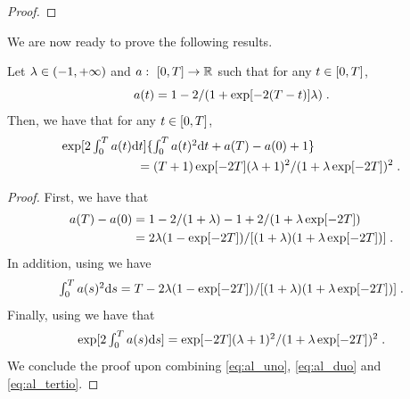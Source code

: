 \begin{proof}
  \end{proof}

    We are now ready to prove the following results.

    \begin{proposition}
      \label{prop:expression_fat_1}
      Let $\lambda \in \left(-1, +\infty\right)$ and $a: \ \left[0,T\right] \to \mathbb{R}$ such
  that for any $t \in \left[0,T\right]$,
  \begin{equation}
    a(t) = 1 - 2/(1 + \exp[-2(T-t)]\lambda) \; . 
  \end{equation}
  Then,  we have that for any $t \in \left[0,T\right]$,
  \begin{align}
    &\textstyle{\exp[2\int_0^T a(t) \mathrm{d}t]\{ \int_0^Ta(t)^2 \mathrm{d}t + a(T) - a(0) + 1\}} \\
    & \qquad \qquad \qquad = (T+1)\exp[-2T](\lambda+1)^2/(1 +\lambda \exp[-2T])^2 \; . 
  \end{align}
  \end{proposition}

  \begin{proof}
    First, we have that
    \begin{align}
      a(T) - a(0) &= 1 - 2 /(1+\lambda) - 1 + 2/(1+\lambda \exp[-2T]) \\
                  &= 2\lambda(1 - \exp[-2T])/[(1+\lambda)(1+\lambda \exp[-2T])] \; .
                    \label{eq:al_uno}
    \end{align}
    In addition, using  we have
  \begin{equation}
    \textstyle{\int_{0}^T a(s)^2 \mathrm{d}s} = T - 2 \lambda(1 - \exp[-2T]) / [(1 + \lambda)(1 + \lambda \exp[-2T])] \; .
    \label{eq:al_duo}
  \end{equation}
  Finally, using  we have that
  \begin{equation}
          \textstyle{
      \exp[2\int_{0}^T a(s) \mathrm{d}s] = \exp[-2T] (\lambda+1)^2 /(1+ \lambda\exp[-2T])^2 \;. 
      }\label{eq:al_tertio}
    \end{equation}
    We conclude the proof upon combining \eqref{eq:al_uno}, \eqref{eq:al_duo}
    and \eqref{eq:al_tertio}.
  \end{proof}

